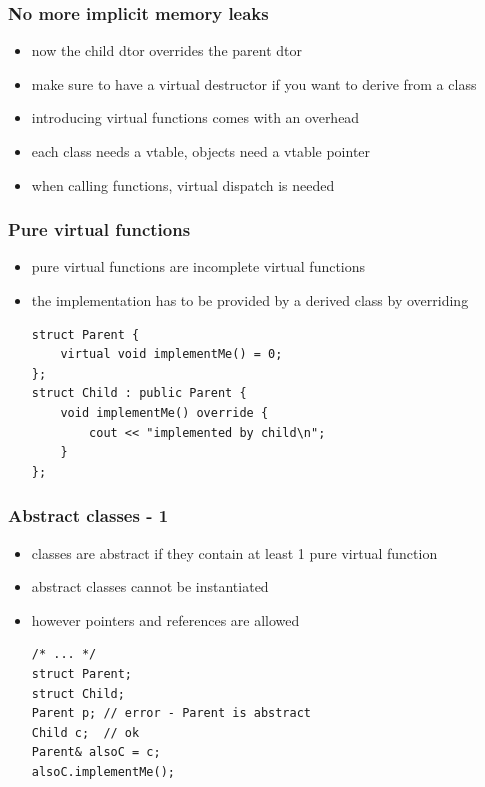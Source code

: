 \begin{frame}[fragile]
    \frametitle{No more implicit memory leaks}
    \begin{itemize}
    \begin{lstlisting}[numbers=none]
class Parent {
public:
    virtual ~Parent() = default;
};
class Child : public Parent {};
Parent* p = new Child();
delete p;
    \end{lstlisting}
    \item now the child dtor overrides the parent dtor
    \item make sure to have a virtual destructor if you want to derive from a class
    \item introducing virtual functions comes with an overhead
    \item each class needs a vtable, objects need a vtable pointer
    \item when calling functions, virtual dispatch is needed
    \end{itemize}
\end{frame}

\begin{frame}[fragile]
    \frametitle{Pure virtual functions}
    \begin{itemize}
    \item pure virtual functions are incomplete virtual functions
    \item the implementation has to be provided by a derived class by overriding
    \begin{lstlisting}[numbers=none]
struct Parent {
    virtual void implementMe() = 0;
};
struct Child : public Parent {
    void implementMe() override {
        cout << "implemented by child\n";
    }
};
    \end{lstlisting}
    \end{itemize}
\end{frame}

\begin{frame}[fragile]
    \frametitle{Abstract classes - 1}
    \begin{itemize}
    \item classes are abstract if they contain at least 1 pure virtual function
    \item abstract classes cannot be instantiated
    \item however pointers and references are allowed
    \begin{lstlisting}[numbers=none]
/* ... */
struct Parent;
struct Child;
Parent p; // error - Parent is abstract
Child c;  // ok
Parent& alsoC = c;
alsoC.implementMe(); 
    \end{lstlisting}
    \end{itemize}
\end{frame}


